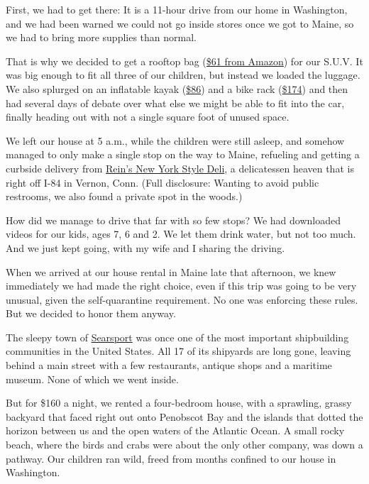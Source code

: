 First, we had to get there: It is a 11-hour drive from our home in
Washington, and we had been warned we could not go inside stores once we
got to Maine, so we had to bring more supplies than normal.

That is why we decided to get a rooftop bag
(\href{https://www.amazon.com/gp/product/B072ZHRDMZ/ref=ppx_yo_dt_b_asin_title_o09_s00?ie=UTF8\&psc=1}{\$61
from Amazon}) for our S.U.V. It was big enough to fit all three of our
children, but instead we loaded the luggage. We also splurged on an
inflatable kayak
(\href{https://www.walmart.com/ip/Intex-Explorer-K2-Inflatable-Kayak-with-Oars-and-Hand-Pump/23662871}{\$86})
and a bike rack
(\href{https://www.amazon.com/gp/product/B00AW6XL8K/ref=ppx_yo_dt_b_asin_title_o00_s00?ie=UTF8\&psc=1}{\$174})
and then had several days of debate over what else we might be able to
fit into the car, finally heading out with not a single square foot of
unused space.

We left our house at 5 a.m., while the children were still asleep, and
somehow managed to only make a single stop on the way to Maine,
refueling and getting a curbside delivery from
\href{https://www.reinsdeli.com/Default.aspx}{Rein's New York Style
Deli}, a delicatessen heaven that is right off I-84 in Vernon, Conn.
(Full disclosure: Wanting to avoid public restrooms, we also found a
private spot in the woods.)

How did we manage to drive that far with so few stops? We had downloaded
videos for our kids, ages 7, 6 and 2. We let them drink water, but not
too much. And we just kept going, with my wife and I sharing the
driving.

When we arrived at our house rental in Maine late that afternoon, we
knew immediately we had made the right choice, even if this trip was
going to be very unusual, given the self-quarantine requirement. No one
was enforcing these rules. But we decided to honor them anyway.

The sleepy town of \href{https://searsport.maine.gov/}{Searsport} was
once one of the most important shipbuilding communities in the United
States. All 17 of its shipyards are long gone, leaving behind a main
street with a few restaurants, antique shops and a maritime museum. None
of which we went inside.

But for \$160 a night, we rented a four-bedroom house, with a sprawling,
grassy backyard that faced right out onto Penobscot Bay and the islands
that dotted the horizon between us and the open waters of the Atlantic
Ocean. A small rocky beach, where the birds and crabs were about the
only other company, was down a pathway. Our children ran wild, freed
from months confined to our house in Washington.

